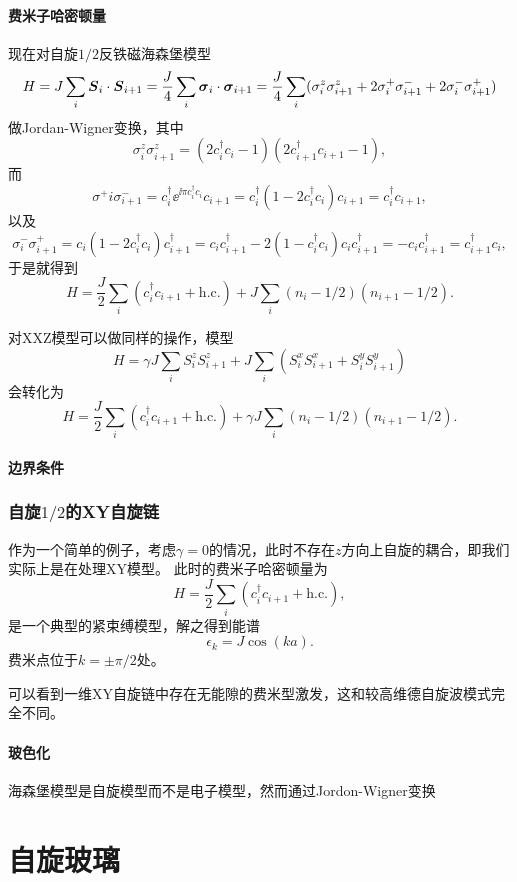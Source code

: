 \subsubsection{费米子哈密顿量}

现在对自旋$1/2$反铁磁海森堡模型
\begin{equation}
    H = J \sum_i \vb*{S}_i \cdot \vb*{S}_{i+1} = \frac{J}{4} \sum_i \vb*{\sigma}_i \cdot \vb*{\sigma}_{i+1} = \frac{J}{4} \sum_i (\sigma^z_{i} \sigma^z_{i+1} + 2 \sigma^+_i \sigma^-_{i+1} + 2 \sigma^-_i \sigma^+_{i+1})
\end{equation}
做Jordan-Wigner变换，其中
\[
    \sigma^z_i \sigma^z_{i+1} = (2 c^\dagger_i c_i - 1) (2 c^\dagger_{i+1} c_{i+1} - 1),
\]
而
\[
    \sigma^+{i} \sigma^-_{i+1} = c^\dagger_i \ee^{\ii \pi c^\dagger_i c_i} c_{i+1} = c^\dagger_i (1 - 2 c^\dagger_i c_i) c_{i+1} = c^\dagger_i c_{i+1},
\]
以及
\[
    \sigma^-_i \sigma^+_{i+1} = c_i (1 - 2 c^\dagger_i c_i) c^\dagger_{i+1} = c_i c_{i+1}^\dagger - 2 (1 - c_i^\dagger c_i) c_i c_{i+1}^\dagger = - c_i c_{i+1}^\dagger = c_{i+1}^\dagger c_i,
\]
于是就得到
\begin{equation}
    H = \frac{J}{2} \sum_i (c_i^\dagger c_{i+1} + \text{h.c.}) + J \sum_{i} (n_i - 1/2) (n_{i+1} - 1/2).
\end{equation}

对XXZ模型可以做同样的操作，模型
\begin{equation}
    H = \gamma J \sum_{i} S^z_{i} S^z_{i+1} + J \sum_{i} (S^x_{i} S^x_{i+1} + S^y_i S^y_{i+1})
\end{equation}
会转化为
\begin{equation}
    H = \frac{J}{2} \sum_i (c_i^\dagger c_{i+1} + \text{h.c.}) + \gamma J \sum_{i} (n_i - 1/2) (n_{i+1} - 1/2).
\end{equation}

\subsubsection{边界条件}


\subsection{自旋$1/2$的XY自旋链}

作为一个简单的例子，考虑$\gamma = 0$的情况，此时不存在$z$方向上自旋的耦合，即我们实际上是在处理XY模型。
此时的费米子哈密顿量为
\begin{equation}
    H = \frac{J}{2} \sum_i (c_i^\dagger c_{i+1} + \text{h.c.}) ,
\end{equation}
是一个典型的紧束缚模型，解之得到能谱
\begin{equation}
    \epsilon_k = J \cos (ka).
\end{equation}
费米点位于$k = \pm \pi / 2$处。

可以看到一维XY自旋链中存在无能隙的费米型激发，这和较高维德自旋波模式完全不同。

\subsubsection{玻色化}

海森堡模型是自旋模型而不是电子模型，然而通过Jordon-Wigner变换 %

\chapter{自旋玻璃}
